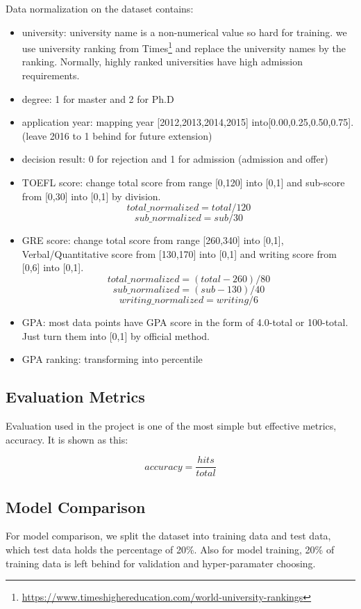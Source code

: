 \documentclass{article}
\begin{document}
Data normalization on the dataset contains:

\begin{itemize}
    \item university: university name is a non-numerical value so hard for training. we use university ranking from Times\footnote{\url{https://www.timeshighereducation.com/world-university-rankings}} and replace the university names by the ranking. Normally, highly ranked universities have high admission requirements.
    \item degree: 1 for master and 2 for Ph.D
    \item application year: mapping year [2012,2013,2014,2015] into[0.00,0.25,0.50,0.75]. (leave 2016 to 1 behind for future extension)
    \item decision result: 0 for rejection and 1 for admission (admission and offer)
    \item TOEFL score: change total score from range [0,120] into [0,1] and sub-score from [0,30] into [0,1] by division.
    $$
    total\_normalized=total/120
    $$
    $$
    sub\_normalized=sub/30
    $$
    \item GRE score: change total score from range [260,340] into [0,1], Verbal/Quantitative score from [130,170] into [0,1] and writing score from [0,6] into [0,1].
    $$
    total\_normalized=(total-260)/80
    $$
    $$
    sub\_normalized=(sub-130)/40
    $$
    $$
    writing\_normalized=writing/6
    $$
    \item GPA: most data points have GPA score in the form of 4.0-total or 100-total. Just turn them into [0,1] by official method.
    \item GPA ranking: transforming into percentile
\end{itemize}

\subsection{Evaluation Metrics}

Evaluation used in the project is one of the most simple but effective metrics, accuracy. It is shown as this:

$$
accuracy=\frac{hits}{total}
$$

\subsection{Model Comparison}

For model comparison, we split the dataset into training data and test data, which test data holds the percentage of 20\%. Also for model training, 20\% of training data is left behind for validation and hyper-paramater choosing.
\end{document}
